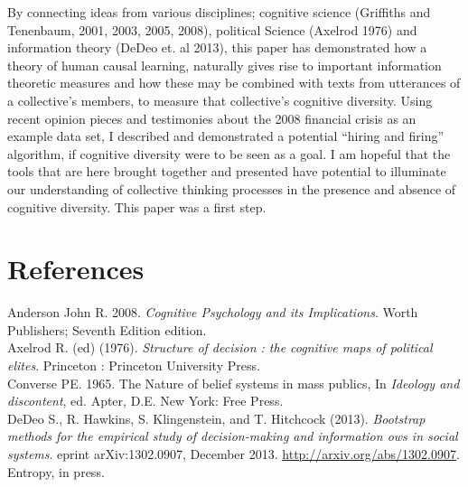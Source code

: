 \documentclass[12pt]{article}
\begin{document}
By connecting ideas from various disciplines; cognitive science (Griffiths and Tenenbaum, 2001, 2003, 2005, 2008), political Science (Axelrod 1976) and information theory (DeDeo et. al 2013), this paper has demonstrated how a theory of human causal learning, naturally gives rise to important information theoretic measures and how these may be combined with texts from utterances of a collective's members, to measure that collective's cognitive diversity. Using recent opinion pieces and testimonies about the 2008 financial crisis as an example data set, I described and demonstrated a potential ``hiring and firing'' algorithm, if cognitive diversity were to be seen as a goal. I am hopeful that the tools that are here brought together and presented have potential to illuminate our understanding of collective thinking processes in the presence and absence of cognitive diversity. This paper was a first step.


\section{References}


Anderson John R. 2008. \textit{Cognitive Psychology and its Implications}. Worth Publishers; Seventh Edition edition.
\\


Axelrod R. (ed) (1976). \textit{Structure of decision : the cognitive maps of political elites}. Princeton : Princeton University Press.
\\



Converse PE. 1965. The Nature of belief systems in mass publics, In \textit{Ideology and discontent}, ed. Apter, D.E. New York: Free Press.
\\

DeDeo S., R. Hawkins, S. Klingenstein, and T. Hitchcock (2013). \textit{Bootstrap methods for the
empirical study of decision-making and information ows in social systems}. eprint
arXiv:1302.0907, December 2013. \href{http://arxiv.org/abs/1302.0907}{http://arxiv.org/abs/1302.0907}. Entropy, in press.
\\
\end{document}
